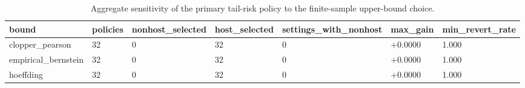 \begin{table}[t]
\centering
\small
\caption{Aggregate sensitivity of the primary tail-risk policy to the finite-sample upper-bound choice.}
\label{tab:tail_risk_bound_sensitivity_aggregate}
\begin{tabular}{lllllll}
\toprule
bound & policies & nonhost\_selected & host\_selected & settings\_with\_nonhost & max\_gain & min\_revert\_rate \\
\midrule
clopper\_pearson & 32 & 0 & 32 & 0 & +0.0000 & 1.000 \\
empirical\_bernstein & 32 & 0 & 32 & 0 & +0.0000 & 1.000 \\
hoeffding & 32 & 0 & 32 & 0 & +0.0000 & 1.000 \\
\bottomrule
\end{tabular}
\end{table}
